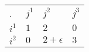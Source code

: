 \begin{center}
    \begin{tabular}{llll}
    .                          & $j^1$    & $j^2$                      & $j^3$                           \\ \cline{2-4}
    \multicolumn{1}{l|}{$i^1$} & $1$ & $2$                   & \multicolumn{1}{l|}{$0$} \\
    \multicolumn{1}{l|}{$i^2$} & $0$ & $2+\epsilon$ & \multicolumn{1}{l|}{$3$} \\ \cline{2-4}
    \end{tabular}
\end{center}